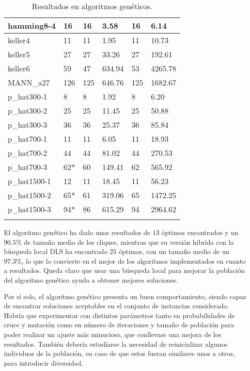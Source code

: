 \begin{small}
\begin{longtable}{l l l l l l}
    hamming8-4         & 16 & 16 & 3.58 & 16 & 6.14\\ \hline
    keller4            & 11 & 11 & 1.95 & 11 & 10.73\\ \hline
    keller5            & 27 & 27 & 33.26 & 27 & 192.61\\ \hline
    keller6            & 59 & 47 & 634.94 & 53 & 4265.78\\ \hline
    MANN\_a27          & 126 & 125 & 646.76 & 125 & 1682.67\\ \hline
    p\_hat300-1        & 8 & 8 & 1.92 & 8 & 6.20\\ \hline
    p\_hat300-2        & 25 & 25 & 11.45 & 25 & 50.88\\ \hline
    p\_hat300-3        & 36 & 36 & 25.37 & 36 & 85.84\\ \hline
    p\_hat700-1        & 11 & 11 & 6.05 & 11 & 18.93\\ \hline
    p\_hat700-2        & 44 & 44 & 81.02 & 44 & 270.53\\ \hline
    p\_hat700-3        & 62* & 60 & 149.41 & 62 & 565.92\\ \hline
    p\_hat1500-1       & 12 & 11 & 18.45 & 11 & 56.23\\ \hline
    p\_hat1500-2       & 65* & 61 & 319.06 & 65 & 1472.25\\ \hline
    p\_hat1500-3       & 94* & 86 & 615.29 & 94 & 2964.62\\ \hline
  \caption{Resultados en algoritmos genéticos.}
\end{longtable}
\end{small}

El algoritmo genético ha dado unos resultados de $13$ óptimos encontrados y un
$90.5\%$ de tamaño medio de los cliques, mientras que su versión híbrida con la
búsqueda local DLS ha encontrado $25$ óptimos, con un tamaño medio de un $97.3\%$,
lo que lo convierte en el mejor de los algoritmos implementados en cuanto a resultados.
Queda claro que usar una búsqueda local para mejorar la población del algoritmo
genético ayuda a obtener mejores soluciones.

Por sí solo, el algoritmo genético presenta un buen comportamiento, siendo capaz de
encontrar soluciones aceptables en el conjunto de instancias considerado. Habría
que experimentar con distintos parámetros tanto en probabilidades de cruce y mutación
como en número de iteraciones y tamaño de población para poder realizar un ajuste más
minucioso, que conllevase una mejora de los resultados. También
debería estudiarse la necesidad de reinicializar algunos individuos de la población,
en caso de que estos fueran similares unos a otros, para introducir diversidad.

